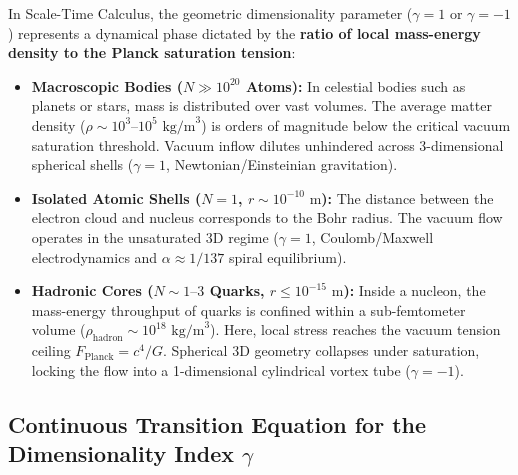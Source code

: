\documentclass[11pt,a4paper]{article}
\begin{document}
In Scale-Time Calculus, the geometric dimensionality parameter ($\gamma = 1$ or $\gamma = -1$) represents a dynamical phase dictated by the \textbf{ratio of local mass-energy density to the Planck saturation tension}:
\begin{itemize}
    \item \textbf{Macroscopic Bodies ($N \gg 10^{20}$ Atoms):} In celestial bodies such as planets or stars, mass is distributed over vast volumes. The average matter density ($\rho \sim 10^3\text{--}10^5\text{ kg/m}^3$) is orders of magnitude below the critical vacuum saturation threshold. Vacuum inflow dilutes unhindered across 3-dimensional spherical shells ($\gamma = 1$, Newtonian/Einsteinian gravitation).
    \item \textbf{Isolated Atomic Shells ($N = 1$, $r \sim 10^{-10}\text{ m}$):} The distance between the electron cloud and nucleus corresponds to the Bohr radius. The vacuum flow operates in the unsaturated 3D regime ($\gamma = 1$, Coulomb/Maxwell electrodynamics and $\alpha \approx 1/137$ spiral equilibrium).
    \item \textbf{Hadronic Cores ($N \sim 1\text{--}3$ Quarks, $r \le 10^{-15}\text{ m}$):} Inside a nucleon, the mass-energy throughput of quarks is confined within a sub-femtometer volume ($\rho_{\mathrm{hadron}} \sim 10^{18}\text{ kg/m}^3$). Here, local stress reaches the vacuum tension ceiling $F_{\mathrm{Planck}} = c^4/G$. Spherical 3D geometry collapses under saturation, locking the flow into a 1-dimensional cylindrical vortex tube ($\gamma = -1$).
\end{itemize}

\subsection{Continuous Transition Equation for the Dimensionality Index $\gamma$}
\label{sec:surekli_gamma_paper3}
\end{document}
